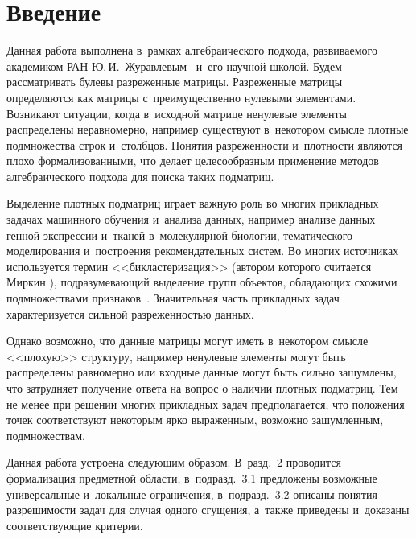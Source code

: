
\thispagestyle{headings}

\begin{multicols}{2}

\label{st\stat}

\section{Введение}

Данная работа выполнена в~рамках алгебраического подхода, развиваемого 
академиком РАН Ю.\,И.~Журавлевым~\cite{Jur1,Jur2,Jur3} и~его научной школой.
Будем рассматривать булевы разреженные матрицы. Разреженные матрицы определяются 
как мат\-ри\-цы с~преимущественно нулевыми элементами. Возникают ситуации, когда 
в~исходной матрице ненулевые элементы распределены неравномерно, например 
существуют в~некотором смысле плотные подмножества строк и~столбцов. Понятия 
разреженности и~плотности являются плохо формализованными, что делает 
целесообразным применение методов алгебраического подхода для поиска таких 
подматриц.

Выделение плотных подматриц играет важную роль во многих прикладных задачах 
машинного обучения и~анализа данных, например анализе данных генной экспрессии 
и~тканей в~молекулярной биологии, тематического моделирования и~построения 
рекомендательных систем. Во многих источниках используется термин 
<<бикластеризация>> (автором которого считается Миркин \cite{Mirkin}),  
подразумевающий выделение групп объектов, обладающих схожими подмножествами 
признаков~\cite{Hartigan, cheng_church,tanay}. Значительная часть прикладных 
задач характеризуется сильной разреженностью данных.

Однако возможно, что данные матрицы могут иметь в~некотором смысле <<плохую>> 
структуру, например ненулевые элементы могут быть распределены равномерно или 
входные данные могут быть сильно зашумлены, что затрудняет получение ответа на 
вопрос о наличии плотных подматриц. Тем не менее при решении многих прикладных 
задач предполагается, что положения точек соответствуют некоторым ярко 
выраженным, возможно зашумленным, подмножествам.

Данная работа устроена следующим образом.
В~разд.~2 проводится формализация предметной области, в~подразд.~3.1 предложены 
возможные универсальные и~локальные ограничения, в~подразд.~3.2 описаны понятия 
разрешимости задач для случая одного сгущения, а~также приведены и~доказаны 
соответствующие критерии.


\end{multicols}
